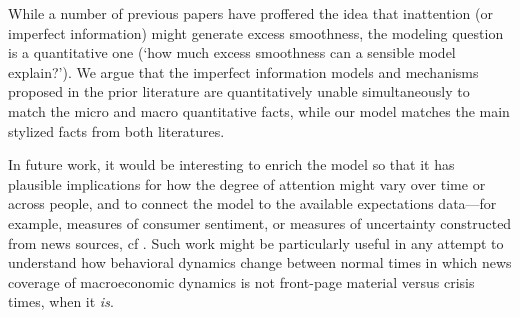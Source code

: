 \documentclass[titlepage]{article}
\begin{document}
While a number of previous papers have proffered the idea that inattention (or imperfect information) might generate excess smoothness, the modeling question is a quantitative one (`how much excess smoothness can a sensible model explain?').  We argue that the imperfect information models and mechanisms proposed in the prior literature are quantitatively unable simultaneously to match the micro and macro quantitative facts, while our model matches the main stylized facts from both literatures.

In future work, it would be interesting to enrich the model so that it has plausible implications for how the degree of attention might vary over time or across people, and to connect the model to the available expectations data---for example, measures of consumer sentiment, or measures of uncertainty constructed from news sources, cf \cite{bbdUncertainty}.  Such work might be particularly useful in any attempt to understand how behavioral dynamics change between normal times in which news coverage of macroeconomic dynamics is not front-page material versus crisis times, when it {\it is}.

\processdelayedfloats

\small

\normalsize
\end{document}
